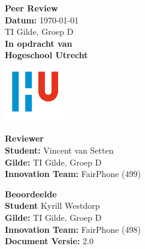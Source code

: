 \documentclass[a4paper]{report}
\begin{document}
\begin{titlepage}
  \begin{center}
      \vspace*{.9cm}
      \Huge
      \textbf{ Peer Review }\\
      \vspace{0.2cm}
      \small \textbf{Datum:} \today \\
      \small TI Gilde, Groep D \\

      \vspace{2cm}
      \normalsize
      \vspace{1cm}
      \Large
      \textbf{In opdracht van}\\
      \large
      \textbf{Hogeschool Utrecht} \\
      \includegraphics[width=0.2\textwidth]{Images/logouni.png}
      \vfill

      \begin{minipage}{0.45\textwidth}
        \large
        \textbf{Reviewer}\\
        \normalsize
        \textbf{Student:} Vincent van Setten \\
        \textbf{Gilde:} TI Gilde, Groep D\\
        \textbf{Innovation Team:} FairPhone (499) \\
        \vspace{2cm}
      \end{minipage}
      \hfill
      \begin{minipage}{0.45\textwidth}
        \large
        \textbf{Beoordeelde}\\
        \normalsize
        \textbf{Student} Kyrill Westdorp  \\
        \textbf{Gilde:} TI Gilde, Groep D\\
        \textbf{Innovation Team:} FairPhone (498) \\
        \textbf{Document Versie:} 2.0 \\
        \vspace{2cm}
      \end{minipage}
    \end{center}
\end{titlepage}
\end{document}
